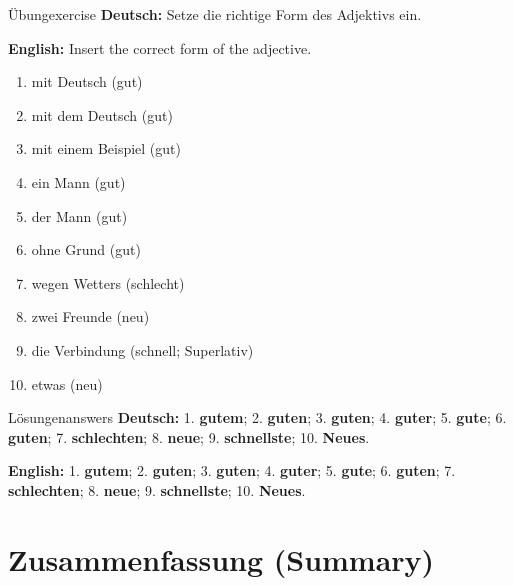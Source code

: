 \documentclass[a4paper,11pt]{article}
\newcommand{\GermanText}[1]{\textbf{Deutsch: }#1\par}
\newcommand{\EnglishText}[1]{{\small\color{SoftGray}\textbf{English: }#1\par}}
\begin{document}
\begin{grammarentry}{Übung}{exercise}
\GermanText{Setze die richtige Form des Adjektivs ein.}
\EnglishText{Insert the correct form of the adjective.}

\begin{enumerate}
\item mit \underline{\hspace{2cm}} Deutsch \quad (gut)
\item mit dem \underline{\hspace{2cm}} Deutsch \quad (gut)
\item mit einem \underline{\hspace{2cm}} Beispiel \quad (gut)
\item ein \underline{\hspace{2cm}} Mann \quad (gut)
\item der \underline{\hspace{2cm}} Mann \quad (gut)
\item ohne \underline{\hspace{2cm}} Grund \quad (gut)
\item wegen \underline{\hspace{2cm}} Wetters \quad (schlecht)
\item zwei \underline{\hspace{2cm}} Freunde \quad (neu)
\item die \underline{\hspace{2cm}} Verbindung \quad (schnell; Superlativ)
\item etwas \underline{\hspace{2cm}} \quad (neu)
\end{enumerate}
\end{grammarentry}

\begin{grammarentry}{Lösungen}{answers}
\GermanText{1. \textbf{gutem}; 2. \textbf{guten}; 3. \textbf{guten}; 4. \textbf{guter}; 5. \textbf{gute}; 6. \textbf{guten}; 7. \textbf{schlechten}; 8. \textbf{neue}; 9. \textbf{schnellste}; 10. \textbf{Neues}.}
\EnglishText{1. \textbf{gutem}; 2. \textbf{guten}; 3. \textbf{guten}; 4. \textbf{guter}; 5. \textbf{gute}; 6. \textbf{guten}; 7. \textbf{schlechten}; 8. \textbf{neue}; 9. \textbf{schnellste}; 10. \textbf{Neues}.}
\end{grammarentry}

\section{Zusammenfassung \textnormal{(Summary)}}
\end{document}
